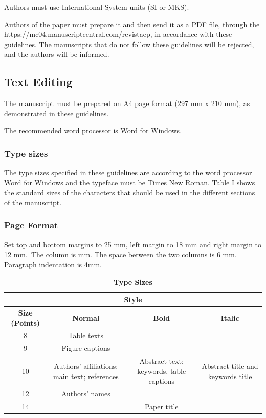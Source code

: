 \documentclass[english]{sobraep}
\begin{document}
Authors must use International System units (SI or MKS).

Authors of the paper must prepare it and then send it as a PDF file, through the https://mc04.manuscriptcentral.com/revistaep, in accordance with these guidelines. The manuscripts that do not follow these guidelines will be rejected, and the authors will be informed.

\subsection{Text Editing}
The manuscript must be prepared on A4 page format \linebreak (297 mm x 210 mm), as demonstrated in these guidelines.

The recommended word processor is Word for Windows.

\subsubsection{Type sizes} The type sizes specified in these guidelines are according to the word processor Word for Windows and the typeface must be Times New Roman. Table I shows the standard sizes of the characters that should be used in the different sections of the manuscript.

\subsubsection{Page Format} Set top and bottom margins to 25 mm, left margin to 18 mm and right margin to 12 mm.~The column is  mm. The space between the two columns is 6 mm. Paragraph indentation is 4mm.

\begin{table}[H]
	\centering
	\caption{\textbf{Type Sizes}}
	\footnotesize
	\setlength{\tabcolsep}{5pt}
	\begin{tabular}{cccc}
		\toprule [1.3pt]	
		\multicolumn{4}{c}{ \textbf{Style} } \\
		\hline
		\multirow{2}{1.1cm}{\centering \textbf{Size (Points)}} & \multirow{2}{*}{\textbf{Normal}} &
		\multirow{2}{*}{\textbf{Bold}} & \multirow{2}{*}{\textbf{Italic}} \\
		&  &  & \\		
		\hline
		8 & Table texts &  &  \\
		\hline
		9 &  Figure captions  &  &  \\
		\hline
		\multirow{3}{*}{10} &
		\multirow{3}{2cm}{\centering Authors' affiliations; main text; references}  &
		\multirow{3}{2cm}{\centering Abstract text; keywords, table captions} &
		\multirow{3}{2.1cm}{\centering Abstract title and keywords title} \\
		& &  &  \\
		& &  &  \\
		\hline
		12 & Authors' names & &  \\
		\hline
		14 &  & Paper title & \vspace*{-0.8mm}\\
		\bottomrule[1.3pt]
	\end{tabular} \label{table:TableI}
\end{table}
\end{document}
